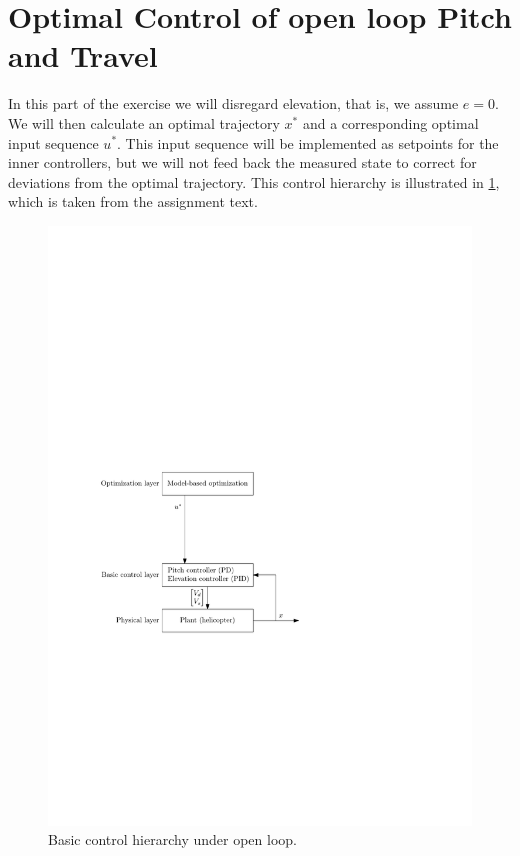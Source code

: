 \section{Optimal Control of open loop Pitch and Travel}\label{sec:open_loop_optimal}
In this part of the exercise we will disregard elevation, that is, we assume $e = 0$. We will then calculate an optimal trajectory $x^{*}$ and a corresponding optimal input sequence $u^{*}$. This input sequence will be implemented as setpoints for the inner controllers, but we will not feed back the measured state to correct for deviations from the optimal trajectory. This control hierarchy is illustrated in \cref{fig:layers_openloop}, which is taken from the assignment text.
\begin{figure}[H]
    \centering
    \includegraphics[width=1.00\textwidth]{figures/layers_openloop.pdf}
    \caption{Basic control hierarchy under open loop.}
\label{fig:layers_openloop}
\end{figure}
